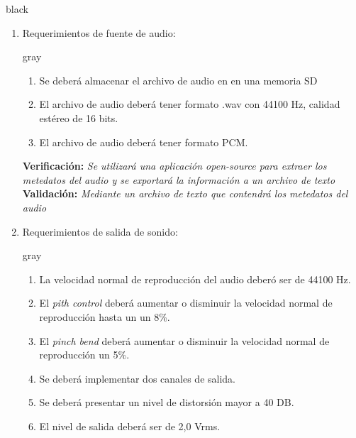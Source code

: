 \documentclass[11pt]{charter}
\begin{document}
\begin{consigna}{black}
\begin{enumerate}
\begin{consigna}{gray}
\begin{enumerate}
	\item Deberá tener un potenciómetro lineal para el ajuste permanente de velocidad.	
	\end{enumerate}
	\end{consigna}
	\textbf{Verificación:} \textit{Análisis visual} \newline                                                                              
	\newline 
	\textbf{Validación:} \textit{Análisis visual}
\item Requerimientos de fuente de audio:
	\begin{consigna}{gray}
	\begin{enumerate}
	\item Se deberá almacenar el archivo de audio en en una memoria SD
	\item El archivo de audio deberá tener formato .wav con 44100 Hz, calidad estéreo de 16 bits.
	\item El archivo de audio deberá tener formato PCM.
	\end{enumerate}
	\end{consigna}
	\textbf{Verificación:} \textit{Se utilizará una aplicación \textit{open-source} para extraer los metedatos del audio y se exportará la información a un archivo de texto} \newline \newline                                                                              
	\textbf{Validación:} \textit{Mediante un archivo de texto que contendrá los metedatos del audio}
\item Requerimientos de salida de sonido:
	\begin{consigna}{gray}
	\begin{enumerate}
	\item La velocidad normal de reproducción del audio deberó ser de 44100 Hz.
	\item El \textit{pith control} deberá aumentar o disminuir la velocidad normal de reproducción hasta un un 8\%.
	\item El \textit{pinch bend} deberá aumentar o disminuir la velocidad normal de reproducción un 5\%.
	\item Se deberá implementar dos canales de salida.
	\item Se deberá presentar un nivel de distorsión mayor a 40 DB.
	\item El nivel de salida deberá ser de 2,0 Vrms.
	\end{enumerate}
	\end{consigna}

\end{enumerate}
\end{consigna}
\end{document}
